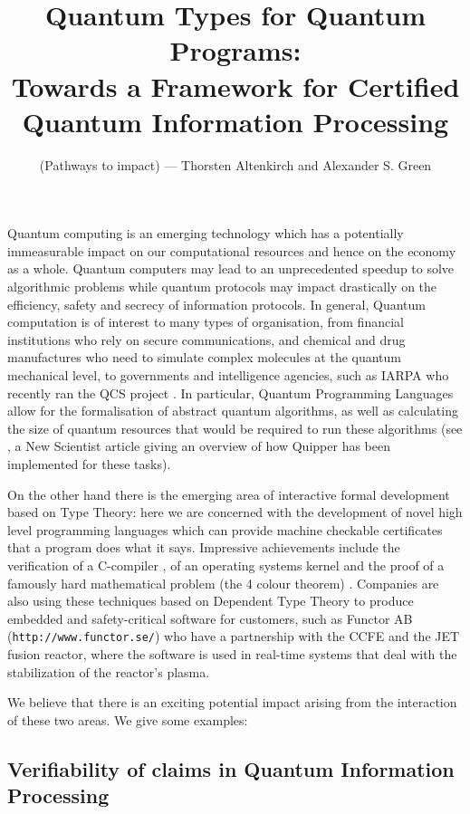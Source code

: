 \documentclass[a4paper]{article}
\title{Quantum Types for Quantum Programs:\\
 \Large Towards a Framework for Certified Quantum Information Processing
}
\author{(Pathways to impact) --- Thorsten Altenkirch and Alexander S. Green}
\date{}
\begin{document}
\maketitle

Quantum computing is an emerging technology which has a potentially
immeasurable impact on our computational resources and hence on the
economy as a whole. Quantum computers may lead to an unprecedented
speedup to solve algorithmic problems while quantum protocols may
impact drastically on the efficiency, safety and secrecy of
information protocols. In general, Quantum computation is of interest
to many types of organisation, from financial institutions who rely on
secure communications, and chemical and drug manufactures who need to
simulate complex molecules at the quantum mechanical level, to
governments and intelligence agencies, such as IARPA who recently ran
the QCS project \cite{QCS}. In particular, Quantum Programming
Languages allow for the formalisation of abstract quantum algorithms,
as well as calculating the size of quantum resources that would be
required to run these algorithms (see \cite{quipper-ns}, a New
Scientist article giving an overview of how Quipper has been implemented
for these tasks).

On the other hand there is the emerging area of interactive formal
development based on Type Theory: here we are concerned with the
development of novel high level programming languages which can
provide machine checkable certificates that a program does what it
says. Impressive achievements include the verification of a C-compiler
\cite{compcert-back},  of an operating systems kernel
\cite{seL4_CACM_10} and the proof of a famously hard mathematical
problem (the 4 colour theorem)
\cite{gonthier:four-colour-paper}. Companies are also using these
techniques based on Dependent Type Theory to produce embedded and
safety-critical software for customers, such as Functor AB
(\texttt{http://www.functor.se/}) who have a partnership with the CCFE
and the JET fusion reactor, where the software is used in real-time
systems that deal with the stabilization of the reactor's plasma.

We believe that there is an exciting potential impact arising from the
interaction of these two areas. We give some examples:

\subsection*{Verifiability of claims in Quantum Information Processing}
\label{sec:do-you-realy}
\end{document}
